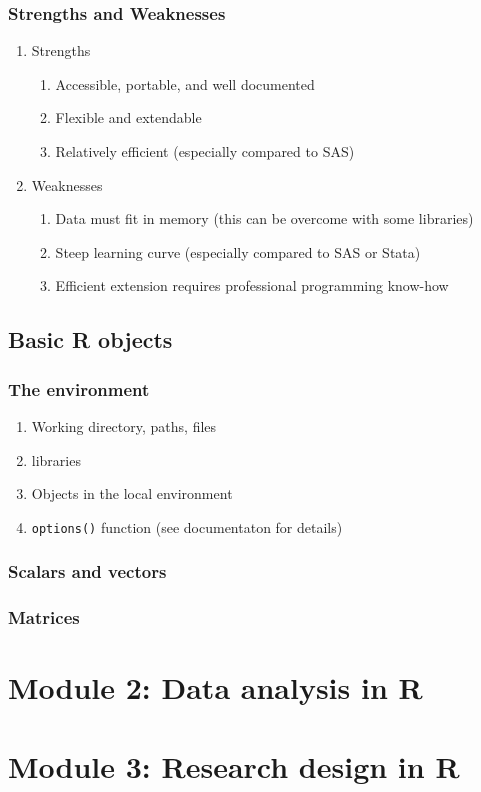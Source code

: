 \documentclass{beamer}
\begin{document}
\begin{frame}
    \frametitle{Strengths and Weaknesses}
    \begin{enumerate}
      \item Strengths
      \begin{enumerate}
        \item Accessible, portable, and well documented
        \item Flexible and extendable
        \item Relatively efficient (especially compared to SAS)
      \end{enumerate}
      \item Weaknesses
      \begin{enumerate}
        \item Data must fit in memory (this can be overcome with some libraries)
        \item Steep learning curve (especially compared to SAS or Stata)
        \item Efficient extension requires professional programming know-how
      \end{enumerate}
    \end{enumerate}
\end{frame}


\subsection{Basic R objects}

\begin{frame}[fragile]
    \frametitle{The environment}
    \begin{enumerate}
      \item Working directory, paths, files
      \item libraries
      \item Objects in the local environment
      \item \texttt{options()} function (see documentaton for details)
    \end{enumerate}
    
\end{frame}


\begin{frame}[fragile]
    \frametitle{Scalars and vectors}
    
\end{frame}


\begin{frame}[fragile]
    \frametitle{Matrices}
    
\end{frame}



\section{Module 2: Data analysis in R}




\section{Module 3: Research design in R}




\end{document}
